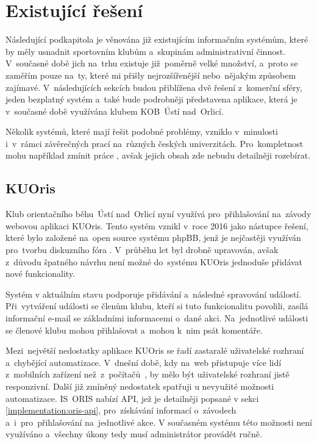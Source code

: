 \section{Existující řešení}
Následující podkapitola je věnována již existujícím informačním systémům, které by měly usnadnit sportovním klubům a~skupinám administrativní činnost. V~současné době jich na~trhu existuje již~poměrně velké množství, a~proto se zaměřím pouze na~ty, které mi přišly nejrozšířenější nebo~nějakým způsobem zajímavé. V~následujících sekcích budou přiblížena dvě řešení z~komerční sféry, jeden bezplatný systém a~také bude podrobněji představena aplikace, která je v~současné době využívána klubem KOB~Ústí nad~Orlicí.

Několik systémů, které mají řešit podobné problémy, vzniklo v~minulosti i~v~rámci závěrečných prací na~různých českých univerzitách. Pro~kompletnost mohu například zmínit práce \cite{fimuni2021, fitcvut2016, fisvse2013}, avšak jejich obsah zde nebudu detailněji rozebírat.

\subsection{KUOris}
\label{section:kuoris}
Klub orientačního běhu~Ústí nad~Orlicí nyní využívá pro~přihlašování na~závody webovou aplikaci KUOris. Tento systém vznikl v~roce 2016 jako nástupce řešení, které bylo založené na~open source systému phpBB, jenž je nejčastěji využíván pro~tvorbu diskuzního fóra \cite{phpbb}. V~průběhu let byl drobně upravován, avšak z~důvodu špatného návrhu není možné do~systému KUOris jednoduše přidávat nové funkcionality.

Systém v aktuálním stavu podporuje přidávání a~následné spravování událostí. Při~vytváření události se členům klubu, kteří si tuto funkcionalitu povolili, zasílá informační e-mail se základními informacemi o~dané akci. Na~jednotlivé události se členové klubu mohou přihlašovat a~mohou k~nim psát komentáře.

Mezi~největší nedostatky aplikace KUOris se řadí zastaralé uživatelské rozhraní a~chybějící automatizace. V~dnešní době, kdy na~web přistupuje více lidí z~mobilních zařízení než~z~počítačů~\cite{deviceusage}, by mělo být uživatelské rozhraní jistě responzivní. Další již zmíněný nedostatek spatřuji u nevyužité možnosti automatizace. IS~ORIS nabízí API, jež je detailněji popsané v sekci \ref{implementation:oris-api}, pro~získávání informací o~závodech a~i~pro~přihlašování na~jednotlivé akce. V současném systému této možnosti není využíváno a~všechny úkony tedy musí administrátor provádět ručně.

